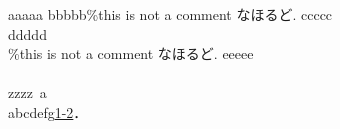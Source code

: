 aaaaa%
bbbbb\%this is not a comment なほるど. \cite{..}
ccccc\\%
ddddd\\\%this is not a comment なほるど. \cite{..}
eeeee\\\\%
zzzz\ a \\%

abcdefg\url{1-2}\cite{...}．
